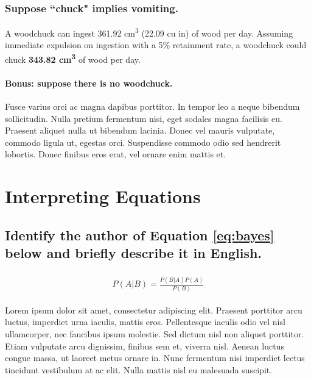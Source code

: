 \documentclass[11pt]{scrartcl} %
\begin{document}


\subsubsection{Suppose ``chuck" implies vomiting.}

A woodchuck can ingest 361.92 cm\textsuperscript{3} (22.09 cu in) of wood per day. Assuming immediate expulsion on ingestion with a 5\% retainment rate, a woodchuck could chuck \textbf{343.82 cm\textsuperscript{3}} of wood per day.


\paragraph{Bonus: suppose there is no woodchuck.}

Fusce varius orci ac magna dapibus porttitor. In tempor leo a neque bibendum sollicitudin. Nulla pretium fermentum nisi, eget sodales magna facilisis eu. Praesent aliquet nulla ut bibendum lacinia. Donec vel mauris vulputate, commodo ligula ut, egestas orci. Suspendisse commodo odio sed hendrerit lobortis. Donec finibus eros erat, vel ornare enim mattis et.


\section{Interpreting Equations}

\subsection{Identify the author of Equation \ref{eq:bayes} below and briefly describe it in English.}

\begin{align} 
	\label{eq:bayes}
	\begin{split}
		P(A|B) = \frac{P(B|A)P(A)}{P(B)}
	\end{split}					
\end{align}

Lorem ipsum dolor sit amet, consectetur adipiscing elit. Praesent porttitor arcu luctus, imperdiet urna iaculis, mattis eros. Pellentesque iaculis odio vel nisl ullamcorper, nec faucibus ipsum molestie. Sed dictum nisl non aliquet porttitor. Etiam vulputate arcu dignissim, finibus sem et, viverra nisl. Aenean luctus congue massa, ut laoreet metus ornare in. Nunc fermentum nisi imperdiet lectus tincidunt vestibulum at ac elit. Nulla mattis nisl eu malesuada suscipit.
\end{document}
